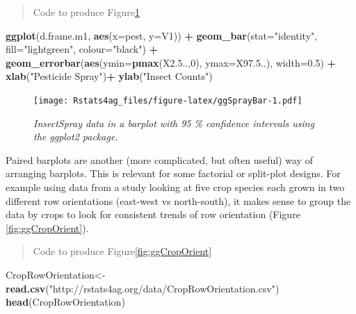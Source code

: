 \documentclass[letterpaper,]{book}
\newenvironment{Shaded}{\begin{snugshade}}{\end{snugshade}}
\newcommand{\DataTypeTok}[1]{\textcolor[rgb]{0.13,0.29,0.53}{#1}}
\newcommand{\DecValTok}[1]{\textcolor[rgb]{0.00,0.00,0.81}{#1}}
\newcommand{\FloatTok}[1]{\textcolor[rgb]{0.00,0.00,0.81}{#1}}
\newcommand{\KeywordTok}[1]{\textcolor[rgb]{0.13,0.29,0.53}{\textbf{#1}}}
\newcommand{\NormalTok}[1]{#1}
\newcommand{\OperatorTok}[1]{\textcolor[rgb]{0.81,0.36,0.00}{\textbf{#1}}}
\newcommand{\StringTok}[1]{\textcolor[rgb]{0.31,0.60,0.02}{#1}}
\begin{document}
\begin{quote}
Code to produce Figure\ref{fig:ggSprayBar}
\end{quote}

\begin{Shaded}
\begin{Highlighting}[]
\KeywordTok{ggplot}\NormalTok{(d.frame.m1, }\KeywordTok{aes}\NormalTok{(}\DataTypeTok{x=}\NormalTok{pest, }\DataTypeTok{y=}\NormalTok{V1)) }\OperatorTok{+}
\StringTok{  }\KeywordTok{geom_bar}\NormalTok{(}\DataTypeTok{stat=}\StringTok{"identity"}\NormalTok{, }\DataTypeTok{fill=}\StringTok{"lightgreen"}\NormalTok{,}
           \DataTypeTok{colour=}\StringTok{"black"}\NormalTok{) }\OperatorTok{+}
\StringTok{  }\KeywordTok{geom_errorbar}\NormalTok{(}\KeywordTok{aes}\NormalTok{(}\DataTypeTok{ymin=}\KeywordTok{pmax}\NormalTok{(X2.}\DecValTok{5}\NormalTok{..,}\DecValTok{0}\NormalTok{), }
                    \DataTypeTok{ymax=}\NormalTok{X97.}\DecValTok{5}\NormalTok{..), }\DataTypeTok{width=}\FloatTok{0.5}\NormalTok{) }\OperatorTok{+}
\StringTok{  }\KeywordTok{xlab}\NormalTok{(}\StringTok{"Pesticide Spray"}\NormalTok{)}\OperatorTok{+}
\StringTok{  }\KeywordTok{ylab}\NormalTok{(}\StringTok{"Insect Counts"}\NormalTok{)}
\end{Highlighting}
\end{Shaded}

\begin{figure}
\centering
\texttt{[image: Rstats4ag\_files/figure-latex/ggSprayBar-1.pdf]}
\caption{\label{fig:ggSprayBar}\emph{InsectSpray data in a barplot with 95 \% confidence intervals using the ggplot2 package.}}
\end{figure}

Paired barplots are another (more complicated, but often useful) way of arranging barplots. This is relevant for some factorial or split-plot designs. For example using data from a study looking at five crop species each grown in two different row orientations (east-west vs north-south), it makes sense to group the data by crops to look for consistent trends of row orientation (Figure \ref{fig:ggCropOrient}).

\begin{quote}
Code to produce Figure\ref{fig:ggCropOrient}
\end{quote}

\begin{Shaded}
\begin{Highlighting}[]
\NormalTok{CropRowOrientation<-}\KeywordTok{read.csv}\NormalTok{(}\StringTok{"http://rstats4ag.org/data/CropRowOrientation.csv"}\NormalTok{)}
\KeywordTok{head}\NormalTok{(CropRowOrientation)}
\end{Highlighting}
\end{Shaded}
\end{document}

